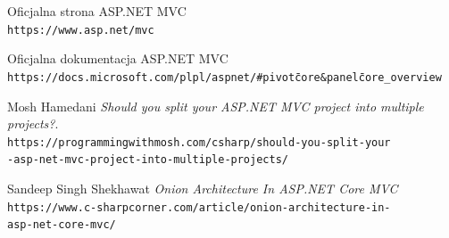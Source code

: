 \documentclass{article}
\begin{document}
\newpage
\begin{thebibliography}{9}

Oficjalna strona ASP.NET MVC
\\\texttt{https://www.asp.net/mvc}

Oficjalna dokumentacja ASP.NET MVC
\\\texttt{https://docs.microsoft.com/pl\-pl/aspnet/\#pivot\=core\&panel\=core\_overview}

Mosh Hamedani
\textit{Should you split your ASP.NET MVC project into multiple projects?}.
\\\texttt{https://programmingwithmosh.com/csharp/should-you-split-your\\-asp-net-mvc-project-into-multiple-projects/}

Sandeep Singh Shekhawat
\textit{Onion Architecture In ASP.NET Core MVC}
\\\texttt{https://www.c-sharpcorner.com/article/onion-architecture-in-\\asp-net-core-mvc/}

\end{thebibliography}
\end{document}
